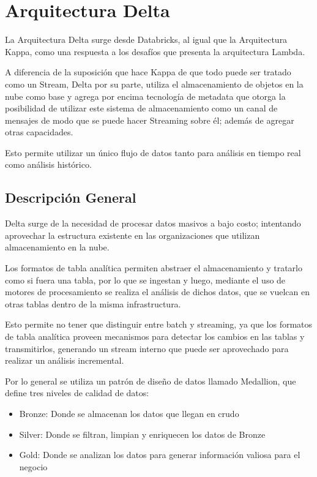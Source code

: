 \section{Arquitectura Delta}


La Arquitectura Delta surge desde Databricks, al igual que la Arquitectura Kappa, 
como una respuesta a los desafíos que presenta la arquitectura Lambda.\newline

A diferencia de la suposición que hace Kappa de que todo puede ser tratado como un Stream, 
Delta por su parte, utiliza el almacenamiento de objetos en la nube como base y 
agrega por encima tecnología de metadata que otorga la posibilidad de utilizar este sistema de almacenamiento
como un canal de mensajes de modo que se puede hacer Streaming sobre él; además de agregar otras capacidades.\newline

Esto permite utilizar un único flujo de datos tanto para análisis en tiempo real como análisis histórico. 


\subsection{Descripción General}

Delta surge de la necesidad de procesar datos masivos a bajo costo; intentando aprovechar la estructura existente
en las organizaciones que utilizan almacenamiento en la nube.\newline

Los formatos de tabla analítica permiten abstraer el almacenamiento y tratarlo como si fuera una tabla, 
por lo que se ingestan y luego, mediante el uso de motores de procesamiento se realiza el análisis de dichos datos,
que se vuelcan en otras tablas dentro de la misma infrastructura.\newline

Esto permite no tener que distinguir entre batch y streaming, ya que los formatos de tabla analítica proveen 
mecanismos para detectar los cambios en las tablas y transmitirlos, generando un stream interno que puede ser
aprovechado para realizar un análisis incremental. 

\newpage

Por lo general se utiliza un patrón de diseño de datos llamado Medallion, que define tres niveles de calidad de datos:
\begin{itemize}
    \item Bronze: Donde se almacenan los datos que llegan en crudo
    \item Silver: Donde se filtran, limpian y enriquecen los datos de Bronze
    \item Gold: Donde se analizan los datos para generar información valiosa para el negocio 
\end{itemize}


